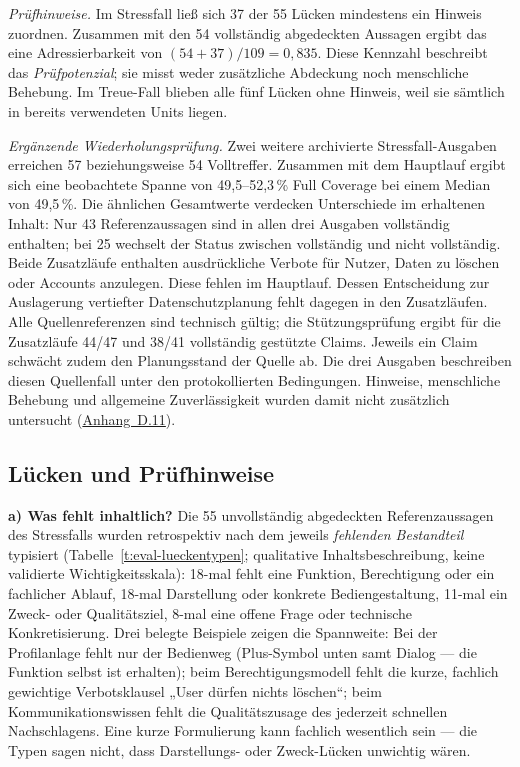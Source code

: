 \emph{Prüfhinweise.} Im Stressfall ließ sich 37 der 55 Lücken
mindestens ein Hinweis zuordnen. Zusammen mit den 54 vollständig
abgedeckten Aussagen ergibt das eine Adressierbarkeit von
$(54+37)/109 = 0{,}835$. Diese Kennzahl beschreibt das
\emph{Prüfpotenzial}; sie misst weder zusätzliche Abdeckung noch
menschliche Behebung. Im Treue-Fall blieben alle fünf Lücken ohne
Hinweis, weil sie sämtlich in bereits verwendeten Units liegen.

\emph{Ergänzende Wiederholungsprüfung.} Zwei weitere archivierte
Stressfall-Ausgaben erreichen 57 beziehungsweise 54 Volltreffer.
Zusammen mit dem Hauptlauf ergibt sich eine beobachtete Spanne von
49{,}5--52{,}3\,\% Full Coverage bei einem Median von 49{,}5\,\%.
Die ähnlichen Gesamtwerte verdecken Unterschiede im erhaltenen
Inhalt: Nur 43 Referenzaussagen sind in allen drei Ausgaben
vollständig enthalten; bei 25 wechselt der Status zwischen
vollständig und nicht vollständig. Beide Zusatzläufe
enthalten ausdrückliche Verbote für Nutzer, Daten zu löschen oder
Accounts anzulegen. Diese fehlen im Hauptlauf. Dessen Entscheidung zur
Auslagerung vertiefter Datenschutzplanung fehlt dagegen in den
Zusatzläufen.
Alle Quellenreferenzen sind technisch gültig; die Stützungsprüfung
ergibt für die Zusatzläufe 44/47 und 38/41 vollständig gestützte
Claims. Jeweils ein Claim schwächt zudem den Planungsstand der Quelle
ab. Die drei Ausgaben beschreiben diesen Quellenfall unter den
protokollierten Bedingungen. Hinweise, menschliche Behebung und
allgemeine Zuverlässigkeit wurden damit nicht zusätzlich untersucht
(\hyperref[anh:ledger-wiederholungen]{Anhang~D.11}).

\subsection{Lücken und Prüfhinweise}
\label{sec:eval-luecken}

\textbf{a) Was fehlt inhaltlich?} Die 55 unvollständig
abgedeckten Referenzaussagen des Stressfalls wurden retrospektiv
nach dem jeweils \emph{fehlenden Bestandteil} typisiert
(Tabelle~\ref{t:eval-lueckentypen}; qualitative Inhaltsbeschreibung,
keine validierte Wichtigkeitsskala): 18-mal fehlt eine Funktion,
Berechtigung oder ein fachlicher Ablauf, 18-mal Darstellung oder
konkrete Bediengestaltung, 11-mal ein Zweck- oder Qualitätsziel,
8-mal eine offene Frage oder technische Konkretisierung. Drei
belegte Beispiele zeigen die Spannweite: Bei der Profilanlage
fehlt nur der Bedienweg (Plus-Symbol unten samt Dialog --- die
Funktion selbst ist erhalten); beim Berechtigungsmodell fehlt die
kurze, fachlich gewichtige Verbotsklausel „User dürfen nichts
löschen``; beim Kommunikationswissen fehlt die
Qualitätszusage des jederzeit schnellen Nachschlagens. Eine kurze
Formulierung kann fachlich wesentlich sein --- die Typen sagen
nicht, dass Darstellungs- oder Zweck-Lücken unwichtig wären.

